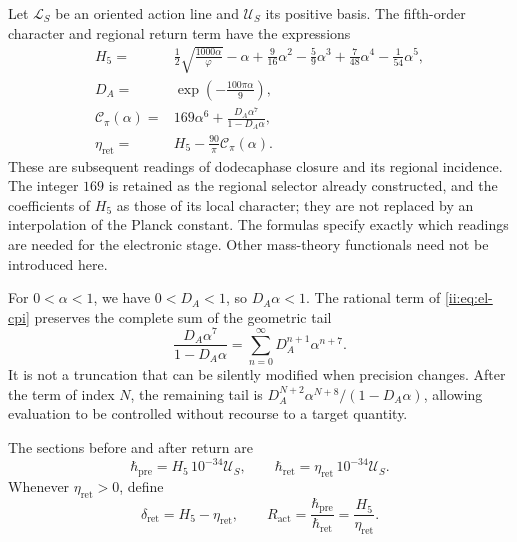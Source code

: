 Let \(\mathcal L_S\) be an oriented action line and \(\mathcal U_S\) its positive basis. The fifth-order character and regional return term have the expressions
\begin{align}
 H_5={}&\frac12\sqrt{\frac{1000\alpha}{\varphi}}-\alpha
   +\frac9{16}\alpha^2-\frac59\alpha^3
   +\frac7{48}\alpha^4-\frac1{54}\alpha^5,
   \label{ii:eq:el-h5}\\
 D_A={}&\exp\!\left(-\frac{100\pi\alpha}{9}\right),
   \label{ii:eq:el-da}\\
 \mathcal C_\pi(\alpha)={}&169\alpha^6+
       \frac{D_A\alpha^7}{1-D_A\alpha},
   \label{ii:eq:el-cpi}\\
 \eta_{\mathrm{ret}}={}&H_5-\frac{90}{\pi}\mathcal C_\pi(\alpha).
   \label{ii:eq:el-eta}
\end{align}
These are subsequent readings of dodecaphase closure and its regional incidence. The integer \(169\) is retained as the regional selector already constructed, and the coefficients of \(H_5\) as those of its local character; they are not replaced by an interpolation of the Planck constant. The formulas specify exactly which readings are needed for the electronic stage. Other mass-theory functionals need not be introduced here.

For \(0<\alpha<1\), we have \(0<D_A<1\), so \(D_A\alpha<1\). The rational term of \eqref{ii:eq:el-cpi} preserves the complete sum of the geometric tail
\begin{equation}
 \frac{D_A\alpha^7}{1-D_A\alpha}
 =\sum_{n=0}^{\infty}D_A^{n+1}\alpha^{n+7}.
 \label{ii:eq:el-cola-regional}
\end{equation}
It is not a truncation that can be silently modified when precision changes. After the term of index \(N\), the remaining tail is \(D_A^{N+2}\alpha^{N+8}/(1-D_A\alpha)\), allowing evaluation to be controlled without recourse to a target quantity.

\begin{definition}
The sections before and after return are
\begin{equation}
 \hbar_{\mathrm{pre}}=H_5\,10^{-34}\mathcal U_S,
 \qquad
 \hbar_{\mathrm{ret}}=\eta_{\mathrm{ret}}\,10^{-34}\mathcal U_S.
 \label{ii:eq:el-secciones-accion}
\end{equation}
Whenever \(\eta_{\mathrm{ret}}>0\), define
\begin{equation}
 \delta_{\mathrm{ret}}=H_5-\eta_{\mathrm{ret}},\qquad
 R_{\mathrm{act}}=\frac{\hbar_{\mathrm{pre}}}{\hbar_{\mathrm{ret}}}
 =\frac{H_5}{\eta_{\mathrm{ret}}}.
 \label{ii:eq:el-ratio}
\end{equation}
\end{definition}

